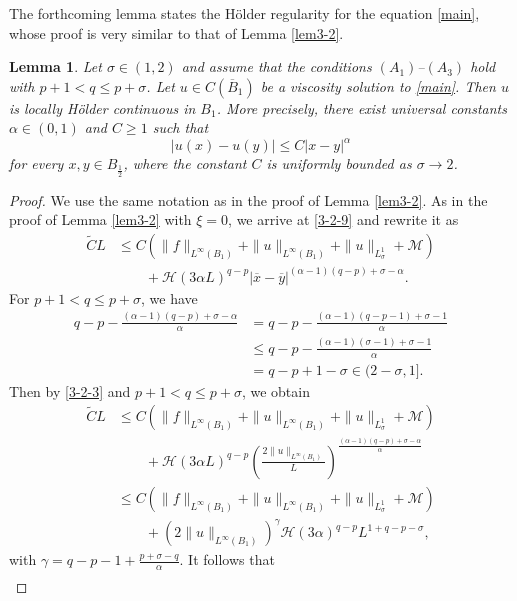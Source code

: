 \documentclass[11pt,reqno]{amsart}
\numberwithin{equation}{section}
\newtheorem{lemma}[theorem]{Lemma}
\begin{document}
The forthcoming lemma states the H\"{o}lder regularity for the equation \eqref{main}, whose proof is very similar to that of Lemma \ref{lem3-2}.

\begin{lemma}
\label{lem3-3}
Let $\sigma\in(1,2)$ and assume that the conditions $(A_1)$--$(A_3)$ hold with $p+1< q\le p+\sigma$. Let $u\in C(\overline{B}_1)$ be a viscosity solution to \eqref{main}. Then $u$ is locally H\"{o}lder continuous in $B_1$. More precisely, there exist universal constants $\alpha\in(0,1)$ and $C\ge1$ such that
$$
|u(x)-u(y)|\le C|x-y|^\alpha
$$
for every $x,y\in B_{\frac12}$, where the constant $C$ is uniformly bounded as $\sigma\rightarrow2$.
\end{lemma}

\begin{proof}
We use the same notation as in the proof of Lemma \ref{lem3-2}.
As in the proof of Lemma \ref{lem3-2} with $\xi=0$, we arrive at \eqref{3-2-9} and rewrite it as
\begin{align*}
\widetilde{C}L
&\le C(\|f\|_{L^\infty(B_1)}+\|u\|_{L^\infty(B_1)}+\|u\|_{L^1_\sigma}+\mathcal{M})\\
&\qquad+\mathcal{H}(3\alpha L)^{q-p}|\overline{x}-\overline{y}|^{(\alpha-1)(q-p)+\sigma-\alpha}.
\end{align*}
For $p+1< q\le p+\sigma$, we have
\begin{align*}
q-p-\frac{(\alpha-1)(q-p)+\sigma-\alpha}{\alpha}&=q-p-\frac{(\alpha-1)(q-p-1)+\sigma-1}{\alpha}\\
&\le q-p-\frac{(\alpha-1)(\sigma-1)+\sigma-1}{\alpha}\\
&=q-p+1-\sigma\in(2-\sigma,1].
\end{align*}
Then by \eqref{3-2-3} and $p+1< q\le p+\sigma$, we obtain
\begin{align*}
\widetilde{C}L&\le C(\|f\|_{L^\infty(B_1)}+\|u\|_{L^\infty(B_1)}+\|u\|_{L^1_\sigma}+\mathcal{M})\\
&\qquad+\mathcal{H}(3\alpha L)^{q-p}\left(\frac{2\|u\|_{L^\infty(B_1)}}{L}\right)^\frac{(\alpha-1)(q-p)+\sigma-\alpha}{\alpha}\\
&\le C(\|f\|_{L^\infty(B_1)}+\|u\|_{L^\infty(B_1)}+\|u\|_{L^1_\sigma}+\mathcal{M})\\
&\qquad+(2\|u\|_{L^\infty(B_1)})^\gamma\mathcal{H}(3\alpha )^{q-p}L^{1+q-p-\sigma},
\end{align*}
with $\gamma=q-p-1+\frac{p+\sigma-q}{\alpha}$.
It follows that
\begin{equation}
\label{3-3-1}
\begin{split}

\end{split}
\end{equation}
\end{proof}
\end{document}
